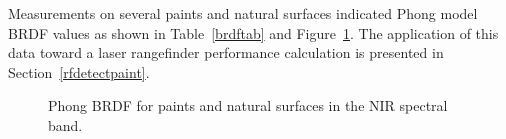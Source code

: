 Measurements on several paints and natural
surfaces\cite{Bergh2004} indicated Phong model BRDF values as shown in
Table~\ref{brdftab} and Figure~\ref{specref1}. The application of this data toward a laser rangefinder performance calculation is presented in Section~\ref{rfdetectpaint}.


\begin{figure}[tb]
\centering
{}
\caption{Phong BRDF for paints and natural surfaces in the NIR spectral band.
\label{specref1}}
\end{figure}



